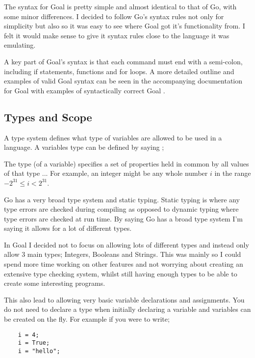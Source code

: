 The syntax for Goal is pretty simple and almost identical to that of Go, with some minor differences. I decided to follow Go's syntax rules not only for simplicity but also so it was easy to see where Goal got it's functionality from. I felt it would make sense to give it syntax rules close to the language it was emulating.
 
A key part of Goal's syntax is that each command must end with a semi-colon, including if statements, functions and for loops. A more detailed outline and examples of valid Goal syntax can be seen in the accompanying documentation for Goal with examples of syntactically correct Goal \cite{GoalDoc}. 

\subsection{Types and Scope}

A type system defines what type of variables are allowed to be used in a language. A variables type can be defined by saying \cite[p.~164]{EngComp2012};

\begin{displayquote}
The type (of a variable) specifies a set of properties held in common by all values of that type ... For example, an integer might be any whole number $i$ in the range $-2^{31} \leq i < 2^{31}$.
\end{displayquote}

Go has a very broad type system and static typing. Static typing is where any type errors are checked during compiling as opposed to dynamic typing where type errors are checked at run time. By saying Go has a broad type system I'm saying it allows for a lot of different types.

In Goal I decided not to focus on allowing lots of different types and instead only allow 3 main types; Integers,  Booleans and Strings. This was mainly so I could spend more time working on other features and not worrying about creating an extensive type checking system, whilst still having enough types to be able to create some interesting programs. 

This also lead to allowing very basic variable declarations and assignments. You do not need to declare a type when initially declaring a variable and variables can be created on the fly. For example if you were to write;

\begin{lstlisting}
	i = 4;
	i = True;
	i = "hello";
\end{lstlisting}

